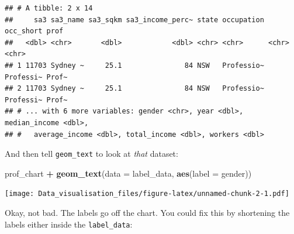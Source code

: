 \documentclass[]{book}
\newenvironment{Shaded}{\begin{snugshade}}{\end{snugshade}}
\newcommand{\DataTypeTok}[1]{\textcolor[rgb]{0.13,0.29,0.53}{#1}}
\newcommand{\KeywordTok}[1]{\textcolor[rgb]{0.13,0.29,0.53}{\textbf{#1}}}
\newcommand{\NormalTok}[1]{#1}
\newcommand{\OperatorTok}[1]{\textcolor[rgb]{0.81,0.36,0.00}{\textbf{#1}}}
\newcommand{\StringTok}[1]{\textcolor[rgb]{0.31,0.60,0.02}{#1}}
\begin{document}
\begin{Shaded}
\end{Shaded}

\begin{verbatim}
## # A tibble: 2 x 14
##     sa3 sa3_name sa3_sqkm sa3_income_perc~ state occupation occ_short prof 
##   <dbl> <chr>       <dbl>            <dbl> <chr> <chr>      <chr>     <chr>
## 1 11703 Sydney ~     25.1               84 NSW   Professio~ Professi~ Prof~
## 2 11703 Sydney ~     25.1               84 NSW   Professio~ Professi~ Prof~
## # ... with 6 more variables: gender <chr>, year <dbl>, median_income <dbl>,
## #   average_income <dbl>, total_income <dbl>, workers <dbl>
\end{verbatim}

And then tell \texttt{geom\_text} to look at \emph{that} dataset:

\begin{Shaded}
\begin{Highlighting}[]
\NormalTok{prof_chart }\OperatorTok{+}
\StringTok{  }\KeywordTok{geom_text}\NormalTok{(}\DataTypeTok{data =}\NormalTok{ label_data,}
            \KeywordTok{aes}\NormalTok{(}\DataTypeTok{label =}\NormalTok{ gender))}
\end{Highlighting}
\end{Shaded}

\texttt{[image: Data\_visualisation\_files/figure-latex/unnamed-chunk-2-1.pdf]}

Okay, not bad. The labels go off the chart. You could fix this by shortening the labels either inside the \texttt{label\_data}:

\begin{Shaded}
\end{Shaded}
\end{document}
